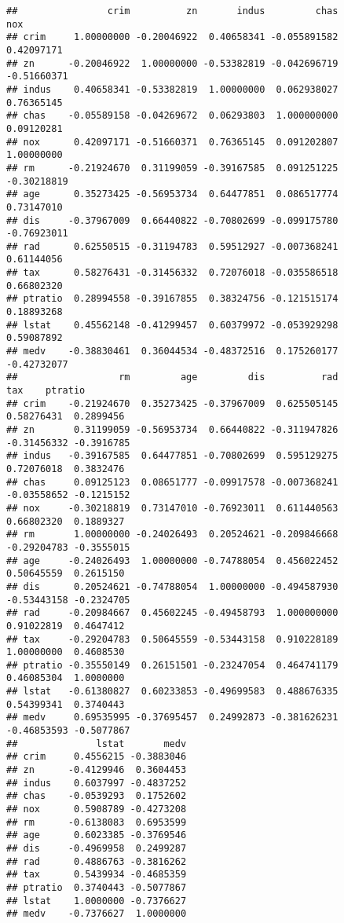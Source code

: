 \documentclass[
]{article}
\begin{document}
\begin{verbatim}
##                crim          zn       indus         chas         nox
## crim     1.00000000 -0.20046922  0.40658341 -0.055891582  0.42097171
## zn      -0.20046922  1.00000000 -0.53382819 -0.042696719 -0.51660371
## indus    0.40658341 -0.53382819  1.00000000  0.062938027  0.76365145
## chas    -0.05589158 -0.04269672  0.06293803  1.000000000  0.09120281
## nox      0.42097171 -0.51660371  0.76365145  0.091202807  1.00000000
## rm      -0.21924670  0.31199059 -0.39167585  0.091251225 -0.30218819
## age      0.35273425 -0.56953734  0.64477851  0.086517774  0.73147010
## dis     -0.37967009  0.66440822 -0.70802699 -0.099175780 -0.76923011
## rad      0.62550515 -0.31194783  0.59512927 -0.007368241  0.61144056
## tax      0.58276431 -0.31456332  0.72076018 -0.035586518  0.66802320
## ptratio  0.28994558 -0.39167855  0.38324756 -0.121515174  0.18893268
## lstat    0.45562148 -0.41299457  0.60379972 -0.053929298  0.59087892
## medv    -0.38830461  0.36044534 -0.48372516  0.175260177 -0.42732077
##                  rm         age         dis          rad         tax    ptratio
## crim    -0.21924670  0.35273425 -0.37967009  0.625505145  0.58276431  0.2899456
## zn       0.31199059 -0.56953734  0.66440822 -0.311947826 -0.31456332 -0.3916785
## indus   -0.39167585  0.64477851 -0.70802699  0.595129275  0.72076018  0.3832476
## chas     0.09125123  0.08651777 -0.09917578 -0.007368241 -0.03558652 -0.1215152
## nox     -0.30218819  0.73147010 -0.76923011  0.611440563  0.66802320  0.1889327
## rm       1.00000000 -0.24026493  0.20524621 -0.209846668 -0.29204783 -0.3555015
## age     -0.24026493  1.00000000 -0.74788054  0.456022452  0.50645559  0.2615150
## dis      0.20524621 -0.74788054  1.00000000 -0.494587930 -0.53443158 -0.2324705
## rad     -0.20984667  0.45602245 -0.49458793  1.000000000  0.91022819  0.4647412
## tax     -0.29204783  0.50645559 -0.53443158  0.910228189  1.00000000  0.4608530
## ptratio -0.35550149  0.26151501 -0.23247054  0.464741179  0.46085304  1.0000000
## lstat   -0.61380827  0.60233853 -0.49699583  0.488676335  0.54399341  0.3740443
## medv     0.69535995 -0.37695457  0.24992873 -0.381626231 -0.46853593 -0.5077867
##              lstat       medv
## crim     0.4556215 -0.3883046
## zn      -0.4129946  0.3604453
## indus    0.6037997 -0.4837252
## chas    -0.0539293  0.1752602
## nox      0.5908789 -0.4273208
## rm      -0.6138083  0.6953599
## age      0.6023385 -0.3769546
## dis     -0.4969958  0.2499287
## rad      0.4886763 -0.3816262
## tax      0.5439934 -0.4685359
## ptratio  0.3740443 -0.5077867
## lstat    1.0000000 -0.7376627
## medv    -0.7376627  1.0000000
\end{verbatim}
\end{document}
